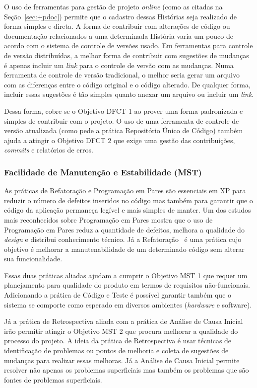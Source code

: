 O uso de ferramentas para gestão de projeto \emph{online} (como as
citadas na Seção~\ref{sec:+pdoc}) permite que o cadastro dessas
Histórias seja realizado de forma simples e direta. A forma de
contribuir com alterações de código ou documentação relacionados a uma
determinada História varia um pouco de acordo com o sistema de
controle de versões usado. Em ferramentas para controle de versão
distribuídas, a melhor forma de contribuir com sugestões de mudanças é
apenas incluir um \textit{link} para o controle de versão com as
mudanças. Numa ferramenta de controle de versão tradicional, o melhor
seria gerar um arquivo com as diferenças entre o código original e o
código alterado. De qualquer forma, incluir essas sugestões é tão
simples quanto anexar um arquivo ou incluir um \textit{link}.

Dessa forma, cobre-se o Objetivo DFCT 1 ao prover uma forma
padronizada e simples de contribuir com o projeto. O uso de uma
ferramenta de controle de versão atualizada (como pede a prática
Repositório Único de Código) também ajuda a atingir o Objetivo DFCT 2
que exige uma gestão das contribuições, \textit{commits} e relatórios
de erros.

\subsubsection{Facilidade de Manutenção e Estabilidade (MST)}
\label{sec:+mst}

As práticas de Refatoração e Programação em Pares são essenciais em XP
para reduzir o número de defeitos inseridos no código mas também para
garantir que o código da aplicação permaneça legível e mais simples de
manter. Um dos estudos mais reconhecidos sobre Programação em Pares
\cite{Williams2000} mostra que o uso de Programação em Pares reduz a
quantidade de defeitos, melhora a qualidade do \textit{design} e
distribui conhecimento técnico. Já a Refatoração~\cite{Refac01} é uma
prática cujo objetivo é melhorar a manutenabilidade de um determinado
código sem alterar sua funcionalidade.

Essas duas práticas aliadas ajudam a cumprir o Objetivo MST 1 que
requer um planejamento para qualidade do produto em termos de
requisitos não-funcionais. Adicionando a prática de Código e Teste é
possível garantir também que o sistema se comporte como esperado em
diversos ambientes (\textit{hardware} e software).

Já a prática de Retrospectiva aliada com a prática de Análise de Causa
Inicial irão permitir atingir o Objetivo MST 2 que procura melhorar a
qualidade do processo do projeto. A ideia da prática de Retrospectiva
\cite{Derby2006} é usar técnicas de identificação de problemas ou
pontos de melhoria e coleta de sugestões de mudanças para realizar
essas melhoras. Já a Análise de Causa Inicial permite resolver não
apenas os problemas superficiais mas também os problemas que são
fontes de problemas superficiais.

